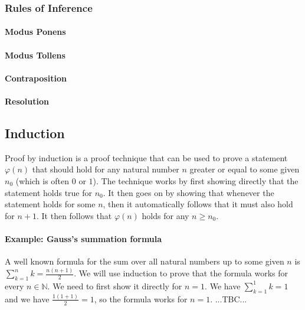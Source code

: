\subsubsection{Rules of Inference}

\paragraph{Modus Ponens}

\paragraph{Modus Tollens}

\paragraph{Contraposition}

\paragraph{Resolution}

\subsection{Induction}
Proof by induction is a proof technique that can be used to prove a statement $\varphi(n)$ that should hold for any natural number $n$ greater or equal to some given $n_0$ (which is often $0$ or $1$). The technique works by first showing directly that the statement holds true for $n_0$. It then goes on by showing that whenever the statement holds for some $n$, then it automatically follows that it must also hold for $n+1$. It then follows that $\varphi(n)$ holds for any $n \geq n_0$.

\paragraph{Example: Gauss's summation formula} A well known formula for the sum over all natural numbers up to some given $n$ is $\sum_{k=1}^n k = \frac{n (n+1)}{2}$. We will use induction to prove that the formula works for every $n \in \mathbb{N}$. We need to first show it directly for $n=1$. We have $\sum_{k=1}^1 k = 1$ and we have $\frac{1 (1+1)}{2} = 1$, so the formula works for $n=1$. ...TBC...

